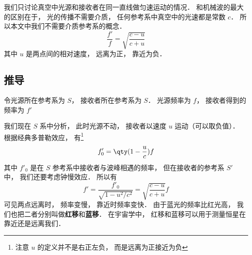 

我们只讨论真空中光源和接收者在同一直线做匀速运动的情况． 和机械波的最大的区别在于， 光的传播不需要介质， 任何参考系中真空中的光速都是常数 $c$． %
所以本文中我们不需要介质参考系的概念．
\begin{equation}
\frac{f'}{f} = \sqrt{\frac{c - u}{c + u}}
\end{equation}
其中 $u$ 是两点间的相对速度， 远离为正， 靠近为负．

\subsection{推导}
令光源所在参考系为 $S$， 接收者所在参考系为 $S$． 光源频率为 $f$， 接收者得到的频率为 $f'$

我们现在 $S$ 系中分析， 此时光源不动， 接收者以速度 $u$ 运动（可以取负值）． 根据经典多普勒效应， 有\footnote{注意 $u$ 的定义并不是右正左负， 而是远离为正接近为负}
\begin{equation}
f'_0 = \qty(1 - \frac{u}{c})f
\end{equation}
其中 $f'_0$ 是在 $S$ 参考系中接收者与波峰相遇的频率， 但在接收者的参考系 $S'$ 中， 我们还要考虑钟慢效应． 所以有
\begin{equation}
f' = \frac{f'_0}{\sqrt{1 - u^2/c^2}} = \sqrt{\frac{c - u}{c + u}} f
\end{equation}
可见两点远离时， 频率变慢， 靠近时频率变快． 由于蓝光的频率比红光高， 我们也把二者分别叫做\textbf{红移}和\textbf{蓝移}． 在宇宙学中， 红移和蓝移可以用于测量恒星在靠近还是远离我们．
